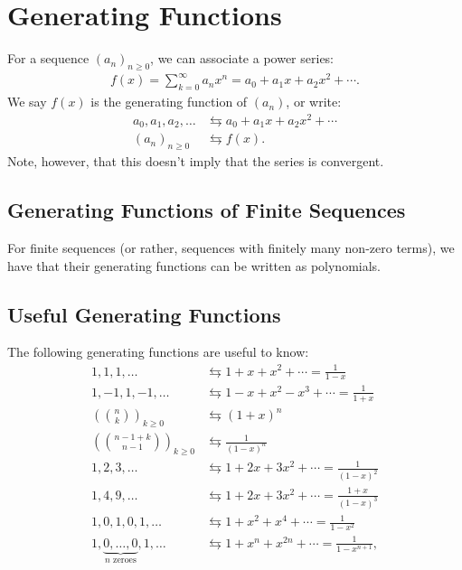 \section{Generating Functions}

For a sequence $(a_n)_{n \geq 0}$, we can associate a power series: 
\begin{gather*}
  f(x) = \sum_{k = 0}^\infty a_nx^n = a_0 + a_1x + a_2x^2 + \cdots.
\end{gather*} We say $f(x)$ is the generating function of $(a_n)$,
or write: \begin{align*}
  a_0, a_1, a_2, \ldots &\leftrightarrows a_0 + a_1x + a_2x^2 + \cdots \\
  (a_n)_{n \geq 0} &\leftrightarrows f(x).
\end{align*} Note, however, that this doesn't imply that the series is convergent.

\subsection{Generating Functions of Finite Sequences}

For finite sequences (or rather, sequences with finitely many
non-zero terms), we have that their generating functions
can be written as polynomials.

\subsection{Useful Generating Functions}

The following generating functions are useful to know: \begin{align*}
  1, 1, 1, \ldots &\leftrightarrows 1 + x + x^2 + \cdots = \frac{1}{1 - x} \\
  1, -1, 1, -1, \ldots &\leftrightarrows 1 - x + x^2 - x^3 + \cdots = \frac{1}{1 + x} \\
  \left(\binom{n}{k}\right)_{k \geq 0} &\leftrightarrows (1 + x)^n \\
  \left(\binom{n - 1 + k}{n - 1}\right)_{k \geq 0} &\leftrightarrows \frac{1}{(1 - x)^n} \\
  1, 2, 3, \ldots &\leftrightarrows 1 + 2x + 3x^2 + \cdots = \frac{1}{(1 - x)^2} \\
  1, 4, 9, \ldots &\leftrightarrows 1 + 2x + 3x^2 + \cdots = \frac{1 + x}{(1 - x)^3} \\
  1, 0, 1, 0, 1, \ldots &\leftrightarrows 1 + x^2 + x^4 + \cdots = \frac{1}{1 - x^2} \\
  1, \underbrace{0, \ldots, 0}_\text{$n$ zeroes}, 1, \ldots 
  &\leftrightarrows 1 + x^n + x^{2n} + \cdots = \frac{1}{1 - x^{n + 1}}, \\
\end{align*}

